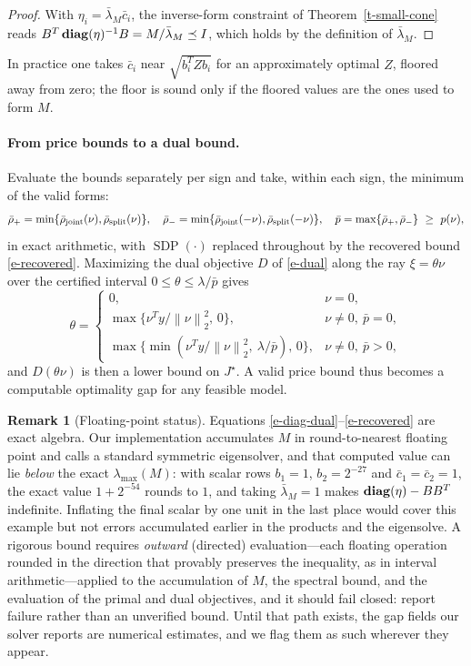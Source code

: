 \documentclass[12pt]{article}
\theoremstyle{plain}
\theoremstyle{definition}
\newtheorem{remark}[theorem]{Remark}
\newcommand{\norm}[1]{\left\lVert #1\right\rVert}
\newcommand{\diag}{\mathop{\bf diag}}
\begin{document}
\begin{proof}
With $\eta_i=\bar\lambda_M\bar c_i$, the inverse-form constraint of
Theorem~\ref{t-small-cone} reads $B^T\diag(\eta)^{-1}B=M/\bar\lambda_M\preceq
I$, which holds by the definition of $\bar\lambda_M$.
\end{proof}

In practice one takes $\bar c_i$ near $\sqrt{b_i^TZb_i}$ for an approximately
optimal $Z$, floored away from zero; the floor is sound only if the floored
values are the ones used to form $M$.

\paragraph{From price bounds to a dual bound.}
Evaluate the bounds separately per sign and take, within each sign, the
minimum of the valid forms:
\[
 \bar\rho_+=\min\{\bar\rho_{\rm joint}(\nu),\bar\rho_{\rm split}(\nu)\},\quad
 \bar\rho_-=\min\{\bar\rho_{\rm joint}(-\nu),\bar\rho_{\rm split}(-\nu)\},\quad
 \bar p=\max\{\bar\rho_+,\bar\rho_-\}\ \ge\ p(\nu),
\]
in exact arithmetic, with $\operatorname{SDP}(\cdot)$ replaced throughout by
the recovered bound \eqref{e-recovered}. Maximizing the dual objective
$D$ of \eqref{e-dual} along the ray $\xi=\theta\nu$ over the certified
interval $0\le\theta\le\lambda/\bar p$ gives
\[
 \theta=
 \begin{cases}
  0,&\nu=0,\\
  \max\{\nu^Ty/\norm\nu_2^2,\,0\},&\nu\ne0,\ \bar p=0,\\
  \max\{\min(\nu^Ty/\norm\nu_2^2,\ \lambda/\bar p),\,0\},
      &\nu\ne0,\ \bar p>0,
 \end{cases}
\]
and $D(\theta\nu)$ is then a lower bound on $J^\star$. A valid price bound
thus becomes a computable optimality gap for any feasible model.

\begin{remark}[Floating-point status]\label{r-floating}
Equations \eqref{e-diag-dual}--\eqref{e-recovered} are exact algebra. Our
implementation accumulates $M$ in round-to-nearest floating point and calls a
standard symmetric eigensolver, and that computed value can lie \emph{below}
the exact $\lambda_{\max}(M)$: with scalar rows $b_1=1$, $b_2=2^{-27}$ and
$\bar c_1=\bar c_2=1$, the exact value $1+2^{-54}$ rounds to $1$, and taking
$\bar\lambda_M=1$ makes $\diag(\eta)-BB^T$ indefinite. Inflating the final
scalar by one unit in the last place would cover this example but not errors
accumulated earlier in the products and the eigensolve. A rigorous bound
requires \emph{outward} (directed) evaluation---each floating operation
rounded in the direction that provably preserves the inequality, as in
interval arithmetic---applied to the accumulation of $M$, the spectral bound,
and the evaluation of the primal and dual objectives, and it should fail
closed: report failure rather than an unverified bound. Until that path
exists, the gap fields our solver reports are numerical estimates, and we
flag them as such wherever they appear.
\end{remark}
\end{document}
